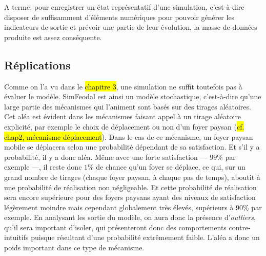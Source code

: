 	A terme, pour enregistrer un état représentatif d'une simulation, c'est-à-dire disposer de suffisamment d'éléments numériques pour pouvoir générer les indicateurs de sortie et prévoir une partie de leur évolution, la masse de données produite est assez conséquente.

	\subsection{Réplications}\label{subsec:capter-replications}

	Comme on l'a vu dans le \hl{chapitre 3}, une simulation ne suffit toutefois pas à évaluer le modèle.
	SimFeodal est ainsi un modèle stochastique, c'est-à-dire qu'une large partie des mécanismes qui l'animent sont basés sur des tirages aléatoires.
	Cet aléa est évident dans les mécanismes faisant appel à un tirage aléatoire explicité, par exemple le choix de déplacement ou non d'un foyer paysan (\hl{cf. chap2, mécanisme déplacement}).
	Dans le cas de ce mécanisme, un foyer paysan mobile se déplacera selon une probabilité dépendant de sa satisfaction.
	Et s'il y a probabilité, il y a donc aléa.
	Même avec une forte satisfaction --- $99\%$ par exemple ---, il reste donc $1\%$ de chance qu'un foyer se déplace, ce qui, sur un grand nombre de tirages (chaque foyer paysan, à chaque pas de temps), aboutit à une probabilité de réalisation non négligeable.
	Et cette probabilité de réalisation sera encore supérieure pour des foyers paysans ayant des niveaux de satisfaction légèrement moindre mais cependant globalement très élevés, supérieurs à $90\%$ par exemple.
	En analysant les sortie du modèle, on aura donc la présence d'\textit{outliers}, qu'il sera important d'isoler, qui présenteront donc des comportements contre-intuitifs puisque résultant d'une probabilité extrêmement faible.
	L'aléa a donc un poids important dans ce type de mécanisme.

